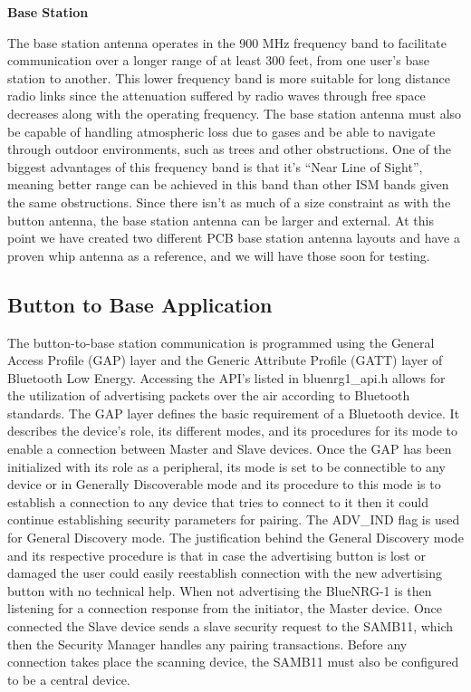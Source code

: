 \documentclass[journal,compsoc]{IEEEtran}
\begin{document}
\textbf {Base Station}

The base station antenna operates in the 900 MHz frequency band to facilitate communication over a longer range of at least 300 feet, from one user’s base station to another.  This lower frequency band is more suitable for long distance radio links since the attenuation suffered by radio waves through free space decreases along with the operating frequency.  The base station antenna must also be capable of handling atmospheric loss due to gases and be able to navigate through outdoor environments, such as trees and other obstructions.  One of the biggest advantages of this frequency band is that it’s “Near Line of Sight”, meaning better range can be achieved in this band than other ISM bands given the same obstructions.  Since there isn’t as much of a size constraint as with the button antenna, the base station antenna can be larger and external.  At this point we have created two different PCB base station antenna layouts and have a proven whip antenna as a reference, and we will have those soon for testing.


\subsection{Button to Base Application}

The button-to-base station communication is programmed using the General Access Profile (GAP) layer and the Generic Attribute Profile (GATT) layer of Bluetooth Low Energy.  Accessing the API’s listed in bluenrg1\_api.h allows for the utilization of advertising packets over the air according to Bluetooth standards.  The GAP layer defines the basic requirement of a Bluetooth device.  It describes the device's role, its different modes, and its procedures for its mode to enable a connection between Master and Slave devices.  Once the GAP has been initialized with its role as a peripheral, its mode is set to be connectible to any device or in Generally Discoverable mode and its procedure to this mode is to establish a connection to any device that tries to connect to it then it could continue establishing security parameters for pairing. The ADV\_IND flag is used for General Discovery mode. The justification behind the General Discovery mode and its respective procedure is that in case the advertising button is lost or damaged the user could easily reestablish connection with the new advertising button with no technical help. When not advertising the BlueNRG-1 is then listening for a connection response from the initiator, the Master device. Once connected the Slave device sends a slave security request to the SAMB11, which then the Security Manager handles any pairing transactions. Before any connection takes place the scanning device, the SAMB11 must also be configured to be a central device.
\end{document}
